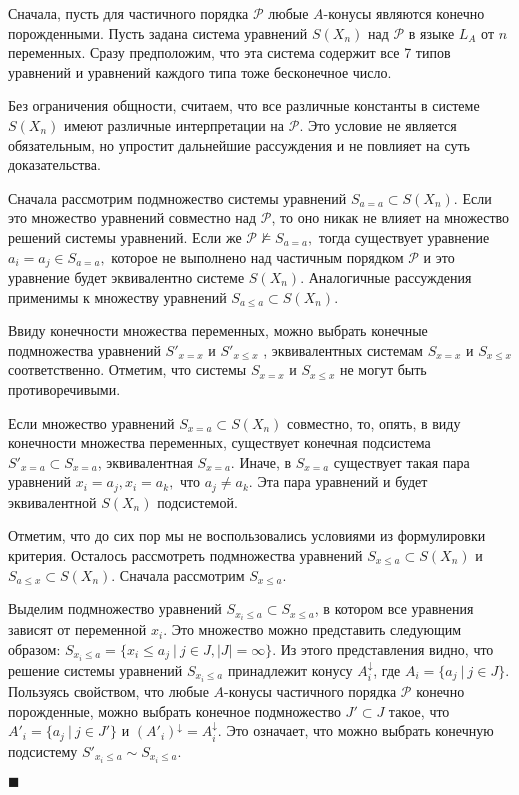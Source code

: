 \documentclass[12pt]{article}
\theoremstyle{break}
\newenvironment{Proof} %
	{\par\noindent{\bf Доказательство.}} %
	{\hfill$\scriptstyle\blacksquare$} %
\def\P{\mathcal{P}}
\begin{document}
		\begin{Proof}
			Сначала, пусть для частичного порядка $\P$ любые $A$-конусы являются конечно порожденными. Пусть задана система уравнений $S(X_n)$ над $\P$ в языке $L_A$ от $n$ переменных. Сразу предположим, что эта система содержит все 7 типов уравнений и уравнений каждого типа тоже бесконечное число.

			Без ограничения общности, считаем, что все различные константы в системе $S(X_n)$ имеют различные интерпретации на $\P$. Это условие не является обязательным, но упростит дальнейшие рассуждения и не повлияет на суть доказательства.

			Сначала рассмотрим подмножество системы уравнений $S_{a=a}\subset S(X_n)$. Если это множество уравнений совместно над $\P$, то оно никак не влияет на множество решений системы уравнений. Если же $\P\nvDash S_{a=a},$ тогда существует уравнение $a_i=a_j\in S_{a=a},$ которое не выполнено над частичным порядком $\P$ и это уравнение будет эквивалентно системе $S(X_n).$ Аналогичные рассуждения применимы к множеству уравнений $S_{a\leqslant a}\subset S(X_n).$

			Ввиду конечности множества переменных, можно выбрать конечные подмножества уравнений $S'_{x=x}$ и $S'_{x\leqslant x}$ , эквивалентных системам $S_{x=x}$ и $S_{x\leqslant x}$ соответственно. Отметим, что системы $S_{x=x}$ и $S_{x\leqslant x}$ не могут быть противоречивыми.

			Если множество уравнений $S_{x=a}\subset S(X_n)$ совместно, то, опять, в виду конечности множества переменных, существует конечная подсистема $S'_{x=a}\subset S_{x=a}$, эквивалентная $S_{x=a}.$ Иначе, в $S_{x=a}$  существует такая пара уравнений $x_i=a_j, x_i=a_k,$ что $a_j\neq a_k$. Эта пара уравнений и будет эквивалентной $S(X_n)$ подсистемой.

			Отметим, что до сих пор мы не воспользовались условиями из формулировки критерия. Осталось рассмотреть подмножества уравнений $S_{x\leqslant a}\subset S(X_n)$ и $S_{a\leqslant x}\subset S(X_n)$. Сначала рассмотрим $S_{x\leqslant a}$.

			Выделим подмножество уравнений $S_{x_i\leqslant a}\subset S_{x\leqslant a}$, в котором все уравнения зависят от переменной $x_i$. Это множество можно представить следующим образом: $S_{x_i\leqslant a}=\{x_i\leqslant a_j\ |\ j\in J, |J| = \infty\}.$ Из этого представления видно, что решение системы уравнений $S_{x_i\leqslant a}$ принадлежит конусу $A_i^{\downarrow}$, где $A_i = \{a_j\ |\ j\in J\}$. Пользуясь свойством, что любые $A$-конусы частичного порядка $\P$ конечно порожденные, можно выбрать конечное подмножество $J'\subset J$ такое, что $A'_i = \{a_j\ |\ j\in J'\}$ и $(A'_i)^{\downarrow} = A_i^{\downarrow}.$ Это означает, что можно выбрать конечную подсистему $S'_{x_i\leqslant a}\sim S_{x_i\leqslant a}$.


\end{Proof}
\end{document}
